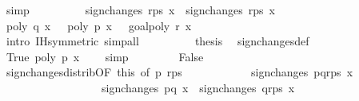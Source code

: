 \begin{isabellebody}
\ simp\isanewline
\ \ \ \ \ \ \isamarkupfalse%
\ \isamarkupfalse%
\ {\isachardoublequoteopen}sign{\isacharunderscore}changes\ {\isacharparenleft}r{\isacharhash}ps{\isacharparenright}\ x\ {\isacharequal}\ sign{\isacharunderscore}changes{\isacharprime}\ {\isacharparenleft}r{\isacharhash}ps{\isacharparenright}\ x\isanewline
\ \ \ \ \ \ \ \ \ \ \isamarkupfalse%
\ {\isacharbackquoteopen}poly\ q\ x\ {\isacharequal}\ {}{\isacharbackquoteclose}\ {\isacharbackquoteopen}poly\ p\ x\ {\isasymnoteq}\ {}{\isacharbackquoteclose}\ goal{}{\isacharparenleft}{}{\isacharparenright}{\isacharbackquoteopen}poly\ r\ x\ {\isasymnoteq}\ {}{\isacharbackquoteclose}\isanewline
\ \ \ \ \ \ \ \ \ \ \isamarkupfalse%
\ {\isacharparenleft}intro\ IH{\isacharparenleft}{}{\isacharparenright}{\isacharbrackleft}symmetric{\isacharbrackright}{\isacharcomma}\ simp{\isacharunderscore}all{\isacharparenright}\isanewline
\ \ \ \ \ \ \isamarkupfalse%
\ \isamarkupfalse%
\ {\isacharquery}thesis\ \isamarkupfalse%
\ sign{\isacharunderscore}changes{\isacharprime}{\isacharunderscore}def\ \isanewline
\ \ \ \ \ \ \ \ \ \ \isamarkupfalse%
\ True\ {\isacharbackquoteopen}poly\ p\ x\ {\isasymnoteq}\ {}{\isacharbackquoteclose}\ \isamarkupfalse%
\ simp\isanewline
\ \ \isamarkupfalse%
\isanewline
\ \ \ \ \isamarkupfalse%
\ False\isanewline
\ \ \ \ \ \ \isamarkupfalse%
\ sign{\isacharunderscore}changes{\isacharunderscore}distrib{\isacharbrackleft}OF\ this{\isacharcomma}\ of\ {\isachardoublequoteopen}{\isacharbrackleft}p{\isacharbrackright}{\isachardoublequoteclose}\ {\isachardoublequoteopen}r{\isacharhash}ps{\isachardoublequoteclose}{\isacharbrackright}\isanewline
\ \ \ \ \ \ \ \ \ \ \isamarkupfalse%
\ {\isachardoublequoteopen}sign{\isacharunderscore}changes\ {\isacharparenleft}p{\isacharhash}q{\isacharhash}r{\isacharhash}ps{\isacharparenright}\ x\ {\isacharequal}\ \isanewline
\ \ \ \ \ \ \ \ \ \ \ \ \ \ \ \ \ \ sign{\isacharunderscore}changes\ {\isacharparenleft}{\isacharbrackleft}p{\isacharcomma}q{\isacharbrackright}{\isacharparenright}\ x\ {\isacharplus}\ sign{\isacharunderscore}changes\ {\isacharparenleft}q{\isacharhash}r{\isacharhash}ps{\isacharparenright}\ x\ \isamarkupfalse%

\end{isabellebody}
